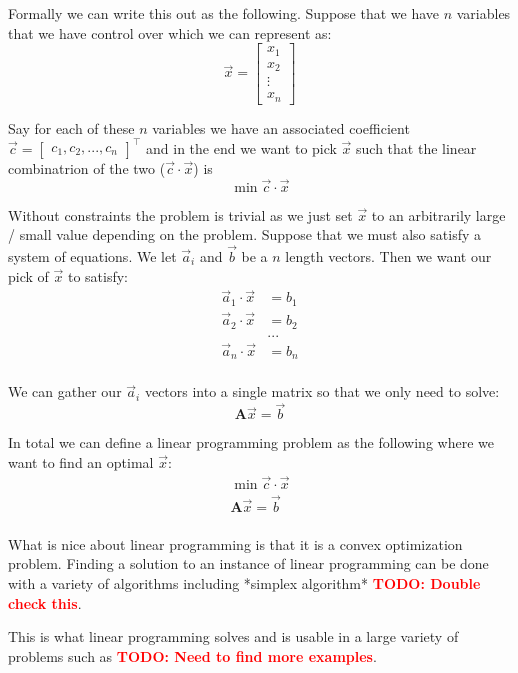 \documentclass{article}
\begin{document}
Formally we can write this out as the following. Suppose that we have \( n \) variables that we have control over which we can represent as:
\[
\vec{x} = \begin{bmatrix} x_1 \\ x_2 \\ \vdots \\ x_n \end{bmatrix}
\]

Say for each of these \( n \) variables we have an associated coefficient \( \vec{c} = \begin{bmatrix} c_1, c_2, ..., c_n  \end{bmatrix}^\top \) and in the end we want to pick \( \vec{x} \) such that the linear combinatrion of the two (\( \vec{c} \cdot \vec{x} \)) is
\[
\min \vec{c} \cdot \vec{x}
\]

Without constraints the problem is trivial as we just set \( \vec{x} \) to an arbitrarily large / small value depending on the problem. Suppose that we must also satisfy a system of equations. We let \( \vec{a}_i \) and \( \vec{b} \) be a \( n \) length vectors. Then we want our pick of \( \vec{x} \) to satisfy:
\begin{align*}
\vec{a}_1 \cdot \vec{x} &= b_1 \\
\vec{a}_2 \cdot \vec{x} &= b_2 \\
& ...  \\
\vec{a}_n \cdot \vec{x} &= b_n \\
\end{align*}

We can gather our \( \vec{a}_i \) vectors into a single matrix so that we only need to solve:
\[
\mathbf{A} \vec{x} = \vec{b}
\]

In total we can define a linear programming problem as the following where we want to find an optimal \( \vec{x} \):
\begin{align*}
  \min \vec{c} \cdot \vec{x} \\
  \mathbf{A} \vec{x} = \vec{b} \\
\end{align*}


What is nice about linear programming is that it is a convex optimization problem. Finding a solution to an instance of linear programming can be done with a variety of algorithms including *simplex algorithm* \textbf{\textcolor{red}{TODO: Double check this}}.

This is what linear programming solves and is usable in a large variety of problems such as
\textbf{\textcolor{red}{TODO: Need to find more examples}}.
\end{document}
